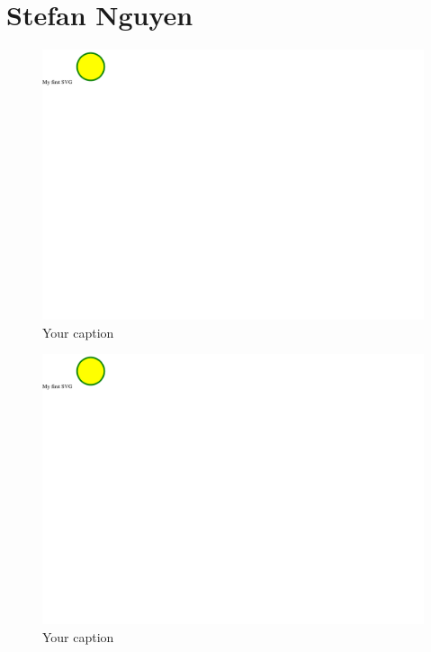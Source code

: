 \documentclass{article}
\begin{document}
\section{Stefan Nguyen}
\begin{figure}[h!]
    \centering
    \captionsetup{labelformat=empty}
    \caption{Your caption}
    \includegraphics[width=\textwidth, angle=0]{Kreis2.pdf}
\end{figure}
\newpage
\begin{figure}[h!]
    \centering
    \captionsetup{labelformat=empty}
    \caption{Your caption}
    \includegraphics[width=\textwidth, angle=0]{Kreis2.pdf}
\end{figure}
\newpage
\end{document}
